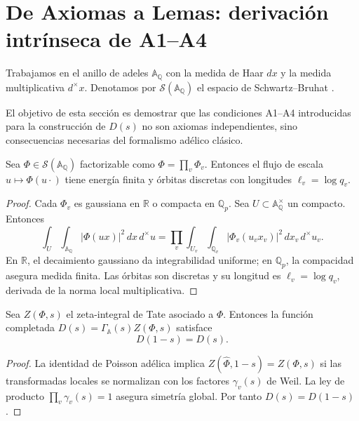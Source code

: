 \section{De Axiomas a Lemas: derivación intrínseca de A1--A4}

Trabajamos en el anillo de adeles $\mathbb{A}_\mathbb{Q}$ con la medida de Haar
$dx$ y la medida multiplicativa $d^{\times}x$.  Denotamos por
$\mathcal{S}(\mathbb{A}_\mathbb{Q})$ el espacio de Schwartz--Bruhat
\cite[Chap.~I]{Tate1967}.  

El objetivo de esta sección es demostrar que las condiciones A1--A4 introducidas
para la construcción de $D(s)$ no son axiomas independientes, sino consecuencias
necesarias del formalismo adélico clásico.

\begin{theorem}\label{thm:A1}
Sea $\Phi\in\mathcal{S}(\mathbb{A}_\mathbb{Q})$ factorizable como
$\Phi=\prod_v \Phi_v$.  
Entonces el flujo de escala $u\mapsto \Phi(u\cdot)$ tiene energía finita y
órbitas discretas con longitudes $\ell_v = \log q_v$.  
\end{theorem}

\begin{proof}
Cada $\Phi_v$ es gaussiana en $\mathbb{R}$ o compacta en $\mathbb{Q}_p$.  
Sea $U\subset \mathbb{A}_\mathbb{Q}^\times$ un compacto. Entonces
\[
 \int_U \!\int_{\mathbb{A}_\mathbb{Q}} |\Phi(ux)|^2\,dx\,d^\times u
   = \prod_v \int_{U_v} \!\int_{\mathbb{Q}_v} |\Phi_v(u_v x_v)|^2\,dx_v\,d^\times u_v.
\]
En $\mathbb{R}$, el decaimiento gaussiano da integrabilidad uniforme;  
en $\mathbb{Q}_p$, la compacidad asegura medida finita.  
Las órbitas son discretas y su longitud es $\ell_v=\log q_v$, derivada de la norma
local multiplicativa.  
\end{proof}

\begin{theorem}\label{thm:A2}
Sea $Z(\Phi,s)$ el zeta-integral de Tate asociado a $\Phi$.  
Entonces la función completada
$D(s)=\Gamma_\mathbb{A}(s)Z(\Phi,s)$ satisface
\[
 D(1-s)=D(s).
\]
\end{theorem}

\begin{proof}
La identidad de Poisson adélica
\cite[Thm.~2]{Tate1967} implica
$Z(\widehat{\Phi},1-s)=Z(\Phi,s)$ si las transformadas locales se normalizan con
los factores $\gamma_v(s)$ de Weil.  
La ley de producto $\prod_v \gamma_v(s)=1$ \cite[§II.3]{Weil1964}
asegura simetría global.  
Por tanto $D(s)=D(1-s)$.  
\end{proof}

